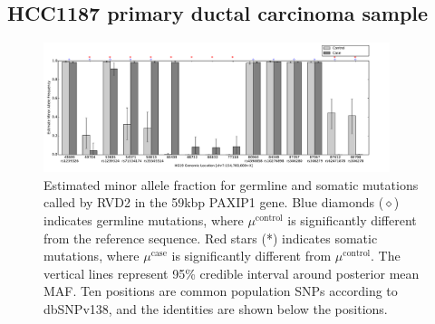 \documentclass{bioinfo}
\begin{document}
\subsection{HCC1187 primary ductal carcinoma sample}\label{sec:brca}
\begin{figure}[!hbpt]
\centering
\vspace{-10pt}
\includegraphics[width=0.9\textwidth]{pdf_figs/HCC1187_MuBarPlot.pdf}
\caption{Estimated minor allele fraction for germline and somatic mutations called by RVD2 in the 59kbp PAXIP1 gene. Blue diamonds ($\diamond$) indicates germline mutations, where $\mu^{\text{control}}$ is significantly different from the reference sequence. Red stars (*) indicates somatic mutations, where $\mu^{\text{case}}$ is significantly different from $ \mu^{\text{control}}$. The  vertical lines represent 95\% credible interval around posterior mean MAF. Ten positions are common population SNPs according to dbSNPv138, and the identities are shown below the positions.}
\vspace{-10pt}
\label{fig:brca_MAF}
\end{figure}
\end{document}
